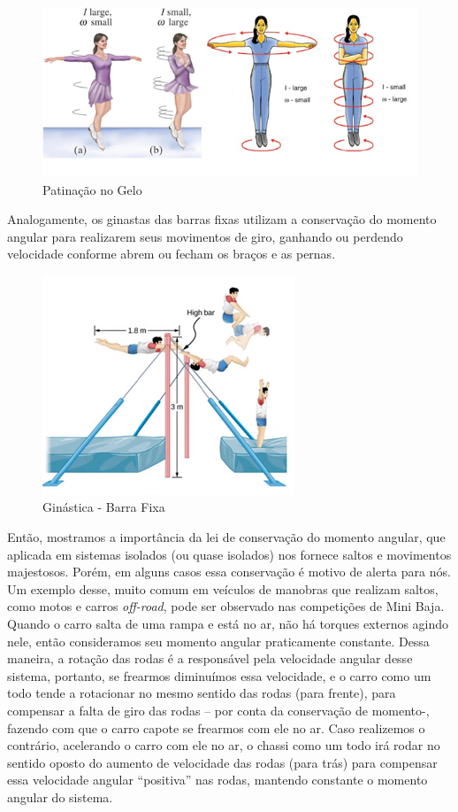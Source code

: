 \begin{figure}[H]
  \centering
  \includegraphics[scale=1.3]{images/i2.png}
  \caption{Patinação no Gelo}
\end{figure}

Analogamente, os ginastas das barras fixas utilizam a conservação do momento angular para realizarem seus movimentos de giro, ganhando ou perdendo velocidade conforme abrem ou fecham os braços e as pernas. \\

\begin{figure}[H]
  \centering
  \includegraphics[scale=1.7]{images/i3.png}
  \caption{Ginástica - Barra Fixa }
\end{figure}

Então, mostramos a importância da lei de conservação do momento angular, que aplicada em sistemas isolados (ou quase isolados) nos fornece saltos e movimentos majestosos. Porém, em alguns casos essa conservação é motivo de alerta para nós.\\

Um exemplo desse, muito comum em veículos de manobras que realizam saltos, como motos e carros \textit{off-road}, pode ser observado nas competições de Mini Baja. Quando o carro salta de uma rampa e está no ar, não há torques externos agindo nele, então consideramos seu momento angular praticamente constante. Dessa maneira, a rotação das rodas é a responsável pela velocidade angular desse sistema, portanto, se frearmos diminuímos essa velocidade, e o carro como um todo tende a rotacionar no mesmo sentido das rodas (para frente), para compensar a falta de giro das rodas – por conta da conservação de momento-, fazendo com que o carro capote se frearmos com ele no ar. 
Caso realizemos o contrário, acelerando o carro com ele no ar, o chassi como um todo irá rodar no sentido oposto do aumento de velocidade das rodas (para trás) para compensar essa velocidade angular “positiva” nas rodas, mantendo constante o momento angular do sistema.\\ 

